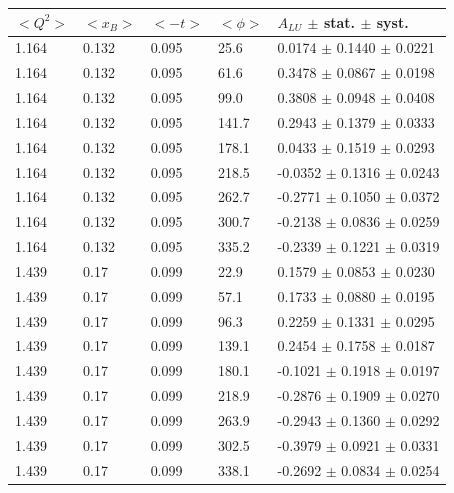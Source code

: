 \documentclass[aps,prc,preprint,superscriptaddress]{revtex4}
\begin{document}
\begin{table}[!h]
   \begin{center}
      \begin{tabular}{||l|l|l|l|l||}
         \hline
 $<Q^{2}>$ & $<x_{B}>$ & $<-t>$ & $<\phi>$ & $A_{LU}$ $\pm$ stat. $\pm$ syst.\\
         \hline

  1.164 & 0.132 & 0.095 & 25.6  &  0.0174 $\pm$ 0.1440 $\pm$ 0.0221 \\
  1.164 & 0.132 & 0.095 & 61.6  &  0.3478 $\pm$ 0.0867 $\pm$ 0.0198 \\
  1.164 & 0.132 & 0.095 & 99.0  &  0.3808 $\pm$ 0.0948 $\pm$ 0.0408 \\
  1.164 & 0.132 & 0.095 & 141.7 &  0.2943 $\pm$ 0.1379 $\pm$ 0.0333 \\
  1.164 & 0.132 & 0.095 & 178.1 &  0.0433 $\pm$ 0.1519 $\pm$ 0.0293 \\
  1.164 & 0.132 & 0.095 & 218.5 & -0.0352 $\pm$ 0.1316 $\pm$ 0.0243 \\
  1.164 & 0.132 & 0.095 & 262.7 & -0.2771 $\pm$ 0.1050 $\pm$ 0.0372 \\
  1.164 & 0.132 & 0.095 & 300.7 & -0.2138 $\pm$ 0.0836 $\pm$ 0.0259 \\
  1.164 & 0.132 & 0.095 & 335.2 & -0.2339 $\pm$ 0.1221 $\pm$ 0.0319 \\
   \hline                                                                                                         
  1.439 & 0.17 & 0.099 &  22.9  &  0.1579 $\pm$ 0.0853 $\pm$ 0.0230 \\
  1.439 & 0.17 & 0.099 &  57.1  &  0.1733 $\pm$ 0.0880 $\pm$ 0.0195 \\
  1.439 & 0.17 & 0.099 &  96.3  &  0.2259 $\pm$ 0.1331 $\pm$ 0.0295 \\
  1.439 & 0.17 & 0.099 &  139.1 &  0.2454 $\pm$ 0.1758 $\pm$ 0.0187 \\
  1.439 & 0.17 & 0.099 &  180.1 & -0.1021 $\pm$ 0.1918 $\pm$ 0.0197 \\
  1.439 & 0.17 & 0.099 &  218.9 & -0.2876 $\pm$ 0.1909 $\pm$ 0.0270 \\
  1.439 & 0.17 & 0.099 &  263.9 & -0.2943 $\pm$ 0.1360 $\pm$ 0.0292 \\
  1.439 & 0.17 & 0.099 &  302.5 & -0.3979 $\pm$ 0.0921 $\pm$ 0.0331 \\
  1.439 & 0.17 & 0.099 &  338.1 & -0.2692 $\pm$ 0.0834 $\pm$ 0.0254 \\
   \hline                                                                                                         

\end{tabular}
\end{center}
\end{table}
\end{document}
